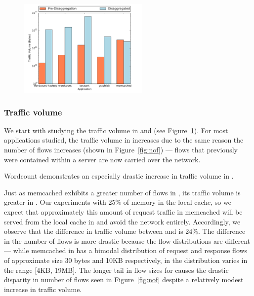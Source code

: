 %
\begin{figure}
  \centering
    \includegraphics[width = 2.5in]{img/graph5_trafficvolume} 
  \caption{\small{}}
  \label{fig:vol}
\end{figure}
%
\subsubsection{Traffic volume}
\label{sssec:tfvol}
We start with studying the traffic volume in \dis and \pdis (see Figure~\ref{fig:vol}). For most applications studied, the traffic volume in \dis increases due to the same reason the number of flows increases (shown in Figure~\ref{fig:nof}) --- flows that previously were contained within a server are now carried over the network.

Wordcount demonstrates an especially drastic increase in traffic volume in \dis. 

Just as memcached exhibits a greater number of flows in \pdis, its traffic volume is greater in \dis. Our experiments with 25\% of memory in the local cache, so we expect that approximately this amount of request traffic in memcached will be served from the local cache in \dis and avoid the network entirely. Accordingly, we observe that the difference in traffic volume between \dis and \pdis is 24\%. The difference in the number of flows is more drastic because the flow distributions are different --- while memcached in \pdis has a bimodal distribution of request and response flows of approximate size 30 bytes and 10KB respectively, in \dis the distribution varies in the range [4KB, 19MB]. The longer tail in flow sizes for \dis causes the drastic disparity in number of flows seen in Figure~\ref{fig:nof} despite a relatively modest increase in traffic volume.

